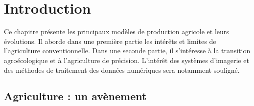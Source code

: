 \documentclass[../thesis.tex]{subfiles}
\begin{document}
    \chapter{Introduction}
    \label{chap:Introduction}
    \setcounter{page}{1}
    
    Ce chapitre présente les principaux modèles de production agricole et leurs évolutions. Il aborde dans une première partie les intérêts et limites de l'agriculture conventionnelle. Dans une seconde partie, il s'intéresse à la transition agroécologique et à l'agriculture de précision. L'intérêt des systèmes d'imagerie et des méthodes de traitement des données numériques sera notamment souligné.
    
    
    
    \section{Agriculture : un avènement}
    
    
    
\end{document}
